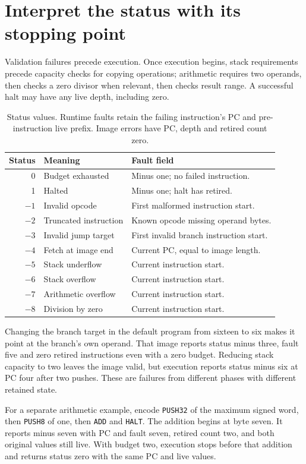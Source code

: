 \section{Interpret the status with its stopping point}\label{vm-statuses}
Validation failures precede execution. Once execution begins, stack requirements
precede capacity checks for copying operations; arithmetic requires two operands,
then checks a zero divisor when relevant, then checks result range. A successful
halt may have any live depth, including zero.

\begin{table}[htbp]
  \centering
  \caption{Status values. Runtime faults retain the failing instruction's PC and pre-instruction live prefix. Image errors have PC, depth and retired count zero.}
  \begin{tabular}{rlp{83mm}}
    \toprule
    Status & Meaning               & Fault field                             \\
    \midrule
    0      & Budget exhausted      & Minus one; no failed instruction.       \\
    1      & Halted                & Minus one; halt has retired.            \\
    $-1$   & Invalid opcode        & First malformed instruction start.      \\
    $-2$   & Truncated instruction & Known opcode missing operand bytes.     \\
    $-3$   & Invalid jump target   & First invalid branch instruction start. \\
    $-4$   & Fetch at image end    & Current PC, equal to image length.      \\
    $-5$   & Stack underflow       & Current instruction start.              \\
    $-6$   & Stack overflow        & Current instruction start.              \\
    $-7$   & Arithmetic overflow   & Current instruction start.              \\
    $-8$   & Division by zero      & Current instruction start.              \\
    \bottomrule
  \end{tabular}
\end{table}

Changing the branch target in the default program from sixteen to six makes it point
at the branch's own operand. That image reports status minus three, fault five and
zero retired instructions even with a zero budget. Reducing stack capacity to two
leaves the image valid, but execution reports status minus six at PC four after two
pushes. These are failures from different phases with different retained state.

For a separate arithmetic example, encode \texttt{PUSH32} of the maximum signed word,
then \texttt{PUSH8} of one, then \texttt{ADD} and \texttt{HALT}. The addition begins
at byte seven. It reports minus seven with PC and fault seven, retired count two,
and both original values still live. With budget two, execution stops before that
addition and returns status zero with the same PC and live values.
